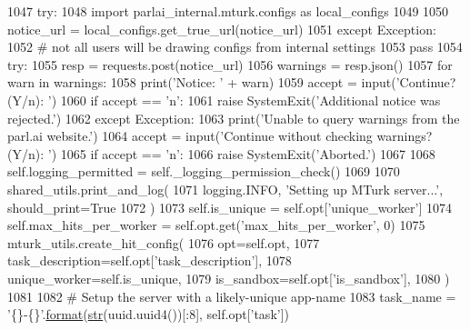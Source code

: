 \begin{DoxyCode}
{{{1047             \textcolor{keywordflow}{try}:
1048                 \textcolor{keyword}{import} parlai\_internal.mturk.configs \textcolor{keyword}{as} local\_configs
1049 
1050                 notice\_url = local\_configs.get\_true\_url(notice\_url)
1051             \textcolor{keywordflow}{except} Exception:
1052                 \textcolor{comment}{# not all users will be drawing configs from internal settings}
1053                 \textcolor{keywordflow}{pass}
1054             \textcolor{keywordflow}{try}:
1055                 resp = requests.post(notice\_url)
1056                 warnings = resp.json()
1057                 \textcolor{keywordflow}{for} warn \textcolor{keywordflow}{in} warnings:
1058                     print(\textcolor{stringliteral}{'Notice: '} + warn)
1059                     accept = input(\textcolor{stringliteral}{'Continue? (Y/n): '})
1060                     \textcolor{keywordflow}{if} accept == \textcolor{stringliteral}{'n'}:
1061                         \textcolor{keywordflow}{raise} SystemExit(\textcolor{stringliteral}{'Additional notice was rejected.'})
1062             \textcolor{keywordflow}{except} Exception:
1063                 print(\textcolor{stringliteral}{'Unable to query warnings from the parl.ai website.'})
1064                 accept = input(\textcolor{stringliteral}{'Continue without checking warnings? (Y/n): '})
1065                 \textcolor{keywordflow}{if} accept == \textcolor{stringliteral}{'n'}:
1066                     \textcolor{keywordflow}{raise} SystemExit(\textcolor{stringliteral}{'Aborted.'})
1067 
1068         self.logging\_permitted = self.\_logging\_permission\_check()
1069 
1070         shared\_utils.print\_and\_log(
1071             logging.INFO, \textcolor{stringliteral}{'Setting up MTurk server...'}, should\_print=\textcolor{keyword}{True}
1072         )
1073         self.is\_unique = self.opt[\textcolor{stringliteral}{'unique\_worker'}]
1074         self.max\_hits\_per\_worker = self.opt.get(\textcolor{stringliteral}{'max\_hits\_per\_worker'}, 0)
1075         mturk\_utils.create\_hit\_config(
1076             opt=self.opt,
1077             task\_description=self.opt[\textcolor{stringliteral}{'task\_description'}],
1078             unique\_worker=self.is\_unique,
1079             is\_sandbox=self.opt[\textcolor{stringliteral}{'is\_sandbox'}],
1080         )
1081 
1082         \textcolor{comment}{# Setup the server with a likely-unique app-name}
1083         task\_name = \textcolor{stringliteral}{'\{\}-\{\}'}.\hyperlink{namespaceparlai_1_1chat__service_1_1services_1_1messenger_1_1shared__utils_a32e2e2022b824fbaf80c747160b52a76}{format}(\hyperlink{namespacegenerate__task__READMEs_a5b88452ffb87b78c8c85ececebafc09f}{str}(uuid.uuid4())[:8], self.opt[\textcolor{stringliteral}{'task'}])
}}}
\end{DoxyCode}
